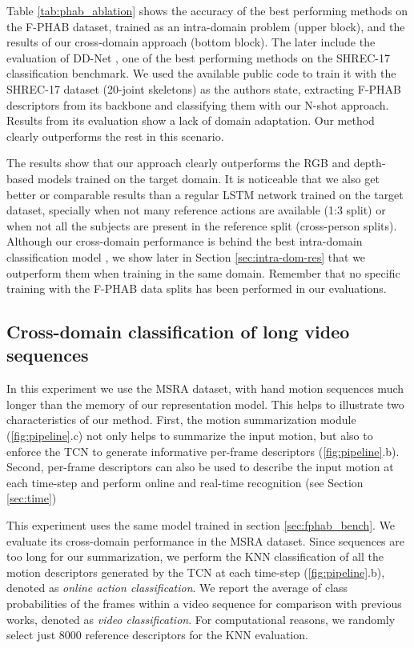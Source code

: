 \documentclass[letterpaper, 10 pt, conference]{ieeeconf}
\begin{document}
Table \ref{tab:phab_ablation} shows the accuracy of the best performing methods on the F-PHAB dataset, trained as an intra-domain problem (upper block), and the results of our cross-domain approach (bottom block). The later include the evaluation of DD-Net \cite{yang2019make}, one of the best performing methods on the SHREC-17 classification benchmark. We used the available public code to train it with the SHREC-17 dataset (20-joint skeletons) as the authors state, extracting F-PHAB descriptors from its backbone and classifying them with our N-shot approach. 
Results from its evaluation show a lack of domain adaptation. Our method clearly outperforms the rest in this scenario.

The results show that our approach clearly outperforms the  RGB \cite{feichtenhofer2016convolutional} and depth-based \cite{oreifej2013hon4d} models trained on the target domain.
It is noticeable that we also get better or comparable results than a regular LSTM network \cite{zhu2016co} trained on the target dataset, specially when not many reference actions are available (1:3 split) or when not all the subjects are present in the reference split (cross-person splits). 
Although our cross-domain performance is behind the best intra-domain classification model \cite{zhang2016efficient}, we show later in Section \ref{sec:intra-dom-res} that we outperform them when training in the same domain. Remember that no specific training with the F-PHAB data splits has been performed in our evaluations.



\subsection{Cross-domain classification of long video sequences}\label{sec:online}
 
In this experiment we use the MSRA dataset, with hand motion sequences much longer than the memory of our representation model. 
This helps to illustrate two characteristics of our method. 
First, the motion summarization module (\ref{fig:pipeline}.c) not only helps to summarize the input motion, but also to enforce the TCN to generate informative per-frame descriptors (\ref{fig:pipeline}.b).
Second, per-frame descriptors can also be used to describe the input motion at each time-step and perform online and real-time recognition (see Section \ref{sec:time})

This experiment uses the same model trained in section \ref{sec:fphab_bench}. We evaluate its cross-domain performance in the MSRA dataset. Since sequences are too long for our summarization, we perform the KNN classification of all the motion descriptors generated by the TCN at each time-step (\ref{fig:pipeline}.b), denoted as \textit{online action classification}. We report the average of class probabilities of the frames within a video sequence for comparison with previous works, denoted as \textit{video classification}. For computational reasons, we randomly select just 8000 reference descriptors for the KNN evaluation. 
\end{document}
